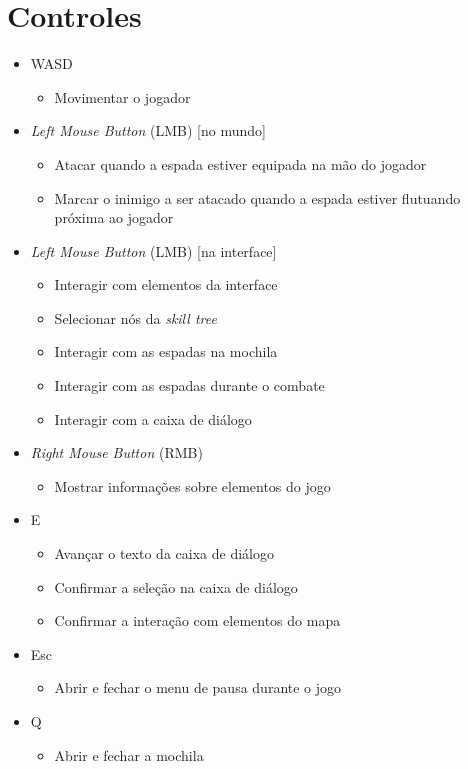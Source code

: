 \section{Controles}

\begin{itemize}
    \item WASD 
    \begin{itemize}
        \item Movimentar o jogador
    \end{itemize}

    \item \textit{Left Mouse Button} (LMB) [no mundo]
    \begin{itemize}
        \item Atacar quando a espada estiver equipada na 
        mão do jogador
        \item Marcar o inimigo a ser atacado quando a 
        espada estiver flutuando próxima ao jogador
    \end{itemize}
    
    \item \textit{Left Mouse Button} (LMB) [na interface]
    \begin{itemize}
        \item Interagir com elementos da interface
        \item Selecionar nós da \textit{skill tree}
        \item Interagir com as espadas na mochila
        \item Interagir com as espadas durante o combate
        \item Interagir com a caixa de diálogo
    \end{itemize}

    \item \textit{Right Mouse Button} (RMB)
    \begin{itemize}
        \item Mostrar informações sobre elementos do jogo
    \end{itemize}
    
    \item E
    \begin{itemize}
        \item Avançar o texto da caixa de diálogo
        \item Confirmar a seleção na caixa de diálogo
        \item Confirmar a interação com elementos do mapa
    \end{itemize}

    \item Esc
    \begin{itemize}
        \item Abrir e fechar o menu de pausa durante o jogo
    \end{itemize}

    \item Q
    \begin{itemize}
        \item Abrir e fechar a mochila
    \end{itemize}
\end{itemize}